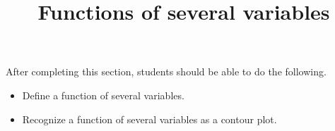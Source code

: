 \documentclass{ximera}
\title{Functions of several variables}
\begin{document}
\begin{abstract}
\end{abstract}

\maketitle

\begin{sectionOutcomes}

After completing this section, students should be able to do the following.

\begin{itemize}
\item Define a function of several variables.
\item Recognize a function of several variables as a contour plot.
\end{itemize}

\end{sectionOutcomes}
\end{document}
